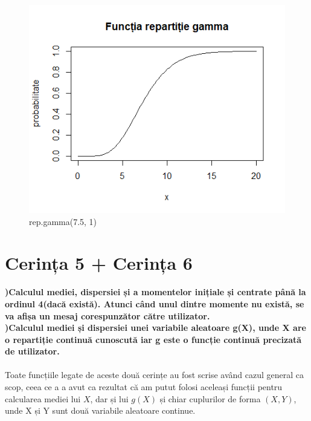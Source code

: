 \documentclass[12pt]{article}
\begin{document}
\begin{figure}
	\centering
	\includegraphics[scale=0.75]{RepGamma}
	\caption{rep.gamma(7.5, 1)}	
\end{figure} \pagebreak

\section{Cerința 5 + Cerința 6}
\textbf{\indent {})Calculul mediei, dispersiei și a momentelor inițiale și centrate până la ordinul 4(dacă există). Atunci când unul dintre momente nu există, se va afișa un mesaj corespunzător către utilizator.\\
	\indent {})Calculul  mediei și  dispersiei unei  variabile  aleatoare g(X), unde  X are  o repartiție continuă cunoscută iar g este o funcție continuă precizată de utilizator.} \\\\
\indent Toate funcțiile legate de aceste două cerințe au fost scrise având cazul general ca scop, ceea ce a a avut ca rezultat că am putut folosi aceleași funcții pentru calcularea mediei lui $X$, dar și lui $g(X)$ și chiar cuplurilor de forma $(X,Y)$, unde X și Y sunt două variabile aleatoare continue.\\
\end{document}
